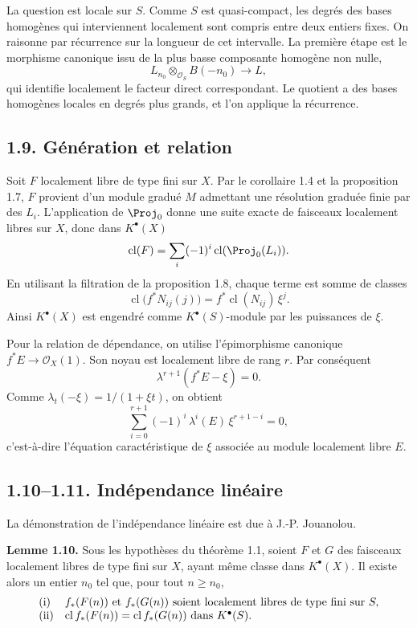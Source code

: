 \documentclass[11pt]{article}
\newcommand{\cl}{\operatorname{cl}}
\begin{document}
La question est locale sur \(S\). Comme \(S\) est quasi-compact, les degrés des bases homogènes qui interviennent localement sont compris entre deux entiers fixes. On raisonne par récurrence sur la longueur de cet intervalle. La première étape est le morphisme canonique issu de la plus basse composante homogène non nulle,
\[
  L_{n_0}\otimes_{\mathcal O_S}B(-n_0)\longrightarrow L,
\]
qui identifie localement le facteur direct correspondant. Le quotient a des bases homogènes locales en degrés plus grands, et l'on applique la récurrence.

\subsection*{1.9. Génération et relation}
Soit \(F\) localement libre de type fini sur \(X\). Par le corollaire 1.4 et la proposition 1.7, \(F\) provient d'un module gradué \(M\) admettant une résolution graduée finie par des \(L_i\). L'application de \(\Proj_0\) donne une suite exacte de faisceaux localement libres sur \(X\), donc dans \(K^\bullet(X)\)
\[
  \cl(F)=\sum_i(-1)^i\cl(\Proj_0(L_i)).
\]
En utilisant la filtration de la proposition 1.8, chaque terme est somme de classes
\[
  \cl\bigl(f^*N_{ij}(j)\bigr)=f^*\cl(N_{ij})\,\xi^j .
\]
Ainsi \(K^\bullet(X)\) est engendré comme \(K^\bullet(S)\)-module par les puissances de \(\xi\).

Pour la relation de dépendance, on utilise l'épimorphisme canonique \(f^*E\to\mathcal O_X(1)\). Son noyau est localement libre de rang \(r\). Par conséquent
\[
  \lambda^{r+1}(f^*E-\xi)=0.
\]
Comme \(\lambda_t(-\xi)=1/(1+\xi t)\), on obtient
\begin{equation}\tag{1.9.1}
  \sum_{i=0}^{r+1}(-1)^i\,\lambda^i(E)\,\xi^{r+1-i}=0,
\end{equation}
c'est-à-dire l'équation caractéristique de \(\xi\) associée au module localement libre \(E\).

\subsection*{1.10--1.11. Indépendance linéaire}
La démonstration de l'indépendance linéaire est due à J.-P. Jouanolou.

\textbf{Lemme 1.10.} Sous les hypothèses du théorème 1.1, soient \(F\) et \(G\) des faisceaux localement libres de type fini sur \(X\), ayant même classe dans \(K^\bullet(X)\). Il existe alors un entier \(n_0\) tel que, pour tout \(n\geq n_0\),
\[
\begin{array}{ll}
\text{\rm (i)}& f_*(F(n))\text{ et }f_*(G(n))\text{ soient localement libres de type fini sur }S,\\
\text{\rm (ii)}& \cl f_*(F(n))=\cl f_*(G(n))\text{ dans }K^\bullet(S).
\end{array}
\]
\end{document}
